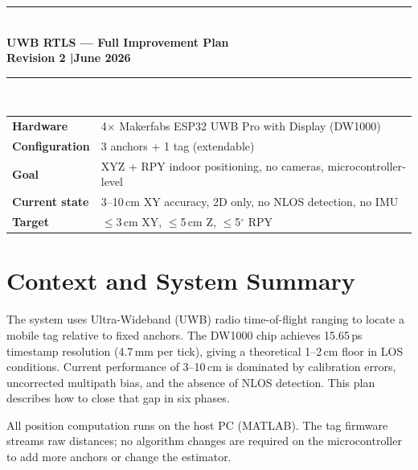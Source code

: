 \documentclass[11pt,a4paper]{article}
\begin{document}

\begin{titlepage}
  \centering\vspace*{2cm}
  {\color{dkblue}\rule{\linewidth}{2pt}}\\[0.5cm]
  {\huge\bfseries UWB RTLS --- Full Improvement Plan\\[0.3cm]
   \large Revision 2 \quad|\quad June 2026}\\[0.4cm]
  {\color{dkblue}\rule{\linewidth}{2pt}}\\[1.5cm]
  \begin{tabular}{ll}
    \textbf{Hardware}      & 4$\times$ Makerfabs ESP32 UWB Pro with Display (DW1000) \\
    \textbf{Configuration} & 3 anchors + 1 tag (extendable) \\
    \textbf{Goal}          & XYZ + RPY indoor positioning, no cameras, microcontroller-level \\
    \textbf{Current state} & 3--10\,cm XY accuracy, 2D only, no NLOS detection, no IMU \\
    \textbf{Target}        & $\leq$3\,cm XY, $\leq$5\,cm Z, $\leq$5$^\circ$ RPY \\
  \end{tabular}
  \vfill
\end{titlepage}

\tableofcontents
\newpage

\section{Context and System Summary}

The system uses Ultra-Wideband (UWB) radio time-of-flight ranging to locate a mobile tag relative to fixed anchors. The DW1000 chip achieves 15.65\,ps timestamp resolution (4.7\,mm per tick), giving a theoretical 1--2\,cm floor in LOS conditions. Current performance of 3--10\,cm is dominated by calibration errors, uncorrected multipath bias, and the absence of NLOS detection. This plan describes how to close that gap in six phases.

All position computation runs on the host PC (MATLAB). The tag firmware streams raw distances; no algorithm changes are required on the microcontroller to add more anchors or change the estimator.
\end{document}
